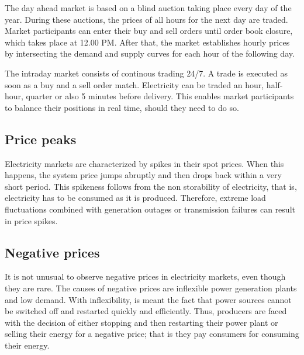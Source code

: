 The day ahead market is based on a blind auction taking place every day of the year.
During these auctions, the prices of all hours for the next day are traded.
Market participants can enter their buy and sell orders until order book closure, which takes place at 12.00 PM. After that, the market establishes hourly prices by intersecting the demand and supply curves for each hour of the following day.

The intraday market consists of continous trading 24/7. A trade is executed as soon as a buy and a sell order match. Electricity can be traded an hour, half-hour, quarter or also 5 minutes before delivery. This enables market participants to balance their positions in real time, should they need to do so.

\subsection{Price peaks}
Electricity markets are characterized by spikes in their spot prices. When this happens, the system price jumps abruptly and then drops back within a very short period.
This spikeness follows from the non storability of electricity, that is, electricity has to be consumed as it is produced. Therefore, extreme load fluctuations combined with generation outages or transmission failures can result in price spikes.

\subsection{Negative prices}
It is not unusual to observe negative prices in electricity markets, even though they are rare.
The causes of negative prices are inflexible power generation plants and low demand. With inflexibility, is meant the fact that power sources cannot be switched off and restarted quickly and efficiently.
Thus, producers are faced with the decision of either stopping and then restarting their power plant or selling their energy for a negative price; that is they pay consumers for consuming their energy.

